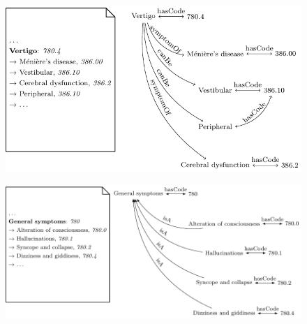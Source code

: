 \begin{figure}
	\centering
	\begin{minipage}[t]{\textwidth}
		\centering
		\includegraphics[scale=.8]{fig/01dataint/04_fromfulltext01.pdf}
		\label{fig:alphaasgraph}
	\end{minipage}
	\begin{minipage}[t]{\textwidth}
		\centering
		\includegraphics[scale=.8]{fig/01dataint/04_fromfulltext02.pdf}
		\label{fig:astaxonomy}
	\end{minipage}
	

\end{figure}
